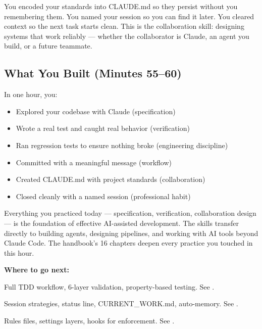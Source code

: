 \documentclass[10pt,oneside]{scrartcl}
\begin{document}

\begin{whybox}
You encoded your standards into CLAUDE.md so they persist without you remembering them. You named your session so you can find it later. You cleared context so the next task starts clean. This is the collaboration skill: designing systems that work reliably --- whether the collaborator is Claude, an agent you build, or a future teammate.
\end{whybox}

\subsection{What You Built (Minutes 55--60)}

In one hour, you:
\begin{itemize}
  \item Explored your codebase with Claude (specification)
  \item Wrote a real test and caught real behavior (verification)
  \item Ran regression tests to ensure nothing broke (engineering discipline)
  \item Committed with a meaningful message (workflow)
  \item Created CLAUDE.md with project standards (collaboration)
  \item Closed cleanly with a named session (professional habit)
\end{itemize}

Everything you practiced today --- specification, verification, collaboration design --- is the foundation of effective AI-assisted development. The skills transfer directly to building agents, designing pipelines, and working with AI tools beyond Claude Code. The handbook's 16 chapters deepen every practice you touched in this hour.

\textbf{Where to go next:}
\begin{description}[leftmargin=3cm, style=sameline, font=\bfseries]
  \item[Testing] Full TDD workflow, 6-layer validation, property-based testing. See \emph{}.
  \item[Context] Session strategies, status line, CURRENT\_WORK.md, auto-memory. See \emph{}.
  \item[CLAUDE.md] Rules files, settings layers, hooks for enforcement. See \emph{}.
\end{description}
\end{document}
